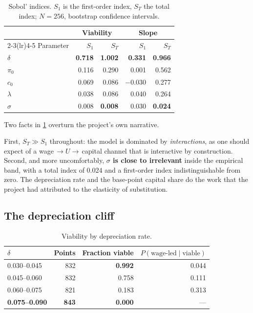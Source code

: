 \begin{table}[htbp]
\centering
\small
\caption{Sobol' indices. $S_1$ is the first-order index, $S_T$ the total
index; $N = 256$, bootstrap confidence intervals.}
\label{tab:sobol}
\begin{tabular}{lrrrr}
\toprule
& \multicolumn{2}{c}{Viability} & \multicolumn{2}{c}{Slope}\\
\cmidrule(lr){2-3}\cmidrule(lr){4-5}
Parameter & $S_1$ & $S_T$ & $S_1$ & $S_T$\\
\midrule
$\delta$        & \textbf{0.718} & \textbf{1.002} & \textbf{0.331} & \textbf{0.966}\\
$\pi_0$         & 0.116 & 0.290 & 0.001 & 0.562\\
$c_0$           & 0.069 & 0.086 & $-0.030$ & 0.277\\
$\lambda$       & 0.038 & 0.086 & 0.040 & 0.264\\
$\sigma$        & 0.008 & \textbf{0.008} & 0.030 & \textbf{0.024}\\
\bottomrule
\end{tabular}
\end{table}

Two facts in \cref{tab:sobol} overturn the project's own narrative.

First, $S_T \gg S_1$ throughout: the model is dominated by \emph{interactions},
as one should expect of a wage$\,\to U \to\,$capital channel that is
interactive by construction. Second, and more uncomfortably, \textbf{$\sigma$
is close to irrelevant} inside the empirical band, with a total index of
$0.024$ and a first-order index indistinguishable from zero. The depreciation
rate and the base-point capital share do the work that the project had
attributed to the elasticity of substitution.

\subsection{The depreciation cliff}
\label{sec:delta}

\begin{table}[htbp]
\centering
\small
\caption{Viability by depreciation rate.}
\label{tab:delta}
\begin{tabular}{lrrr}
\toprule
$\delta$ & Points & Fraction viable & $P(\text{wage-led} \mid \text{viable})$\\
\midrule
0.030--0.045 & 832 & \textbf{0.992} & 0.044\\
0.045--0.060 & 832 & 0.758 & 0.111\\
0.060--0.075 & 821 & 0.183 & 0.313\\
\textbf{0.075--0.090} & \textbf{843} & \textbf{0.000} & ---\\
\bottomrule
\end{tabular}
\end{table}

